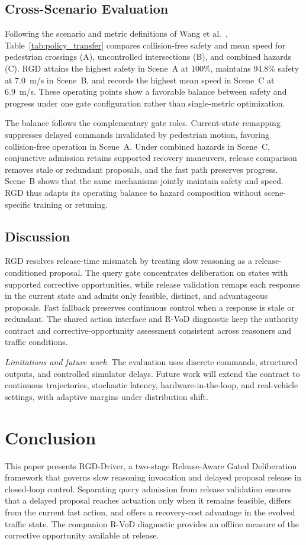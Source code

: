 \documentclass[letterpaper,journal]{IEEEtran}
\begin{document}
\subsection{Cross-Scenario Evaluation}
Following the scenario and metric definitions of Wang et
al.~\cite{titsPolicyTransfer2025}, Table~\ref{tab:policy_transfer} compares
collision-free safety and mean speed for pedestrian crossings (A), uncontrolled
intersections (B), and combined hazards (C). RGD attains the highest safety in
Scene~A at 100\%, maintains 94.8\% safety at 7.0~m/s in Scene~B, and records the
highest mean speed in Scene~C at 6.9~m/s. These operating points show a favorable
balance between safety and progress under one gate configuration rather than
single-metric optimization.

The balance follows the complementary gate roles. Current-state remapping
suppresses delayed commands invalidated by pedestrian motion, favoring
collision-free operation in Scene~A. Under combined hazards in Scene~C,
conjunctive admission retains supported recovery maneuvers, release comparison
removes stale or redundant proposals, and the fast path preserves progress.
Scene~B shows that the same mechanisms jointly maintain safety and speed. RGD
thus adapts its operating balance to hazard composition without scene-specific
training or retuning.
\subsection{Discussion}
RGD resolves release-time mismatch by treating slow reasoning as a
release-conditioned proposal. The query gate concentrates deliberation on
states with supported corrective opportunities, while release validation
remaps each response in the current state and admits only feasible, distinct,
and advantageous proposals. Fast fallback preserves continuous control when a
response is stale or redundant. The shared action interface and R-VoD
diagnostic keep the authority contract and corrective-opportunity assessment
consistent across reasoners and traffic conditions.

\noindent\textit{Limitations and future work.}
The evaluation uses discrete commands, structured outputs, and controlled
simulator delays. Future work will extend the contract to continuous
trajectories, stochastic latency, hardware-in-the-loop, and real-vehicle
settings, with adaptive margins under distribution shift.
\section{Conclusion}
\label{sec:conclusion}
This paper presents RGD-Driver, a two-stage Release-Aware Gated Deliberation
framework that governs slow reasoning invocation and delayed proposal release
in closed-loop control. Separating query admission from release validation
ensures that a delayed proposal reaches actuation only when it remains feasible,
differs from the current fast action, and offers a recovery-cost advantage in
the evolved traffic state. The companion R-VoD diagnostic provides an offline
measure of the corrective opportunity available at release.
\end{document}
